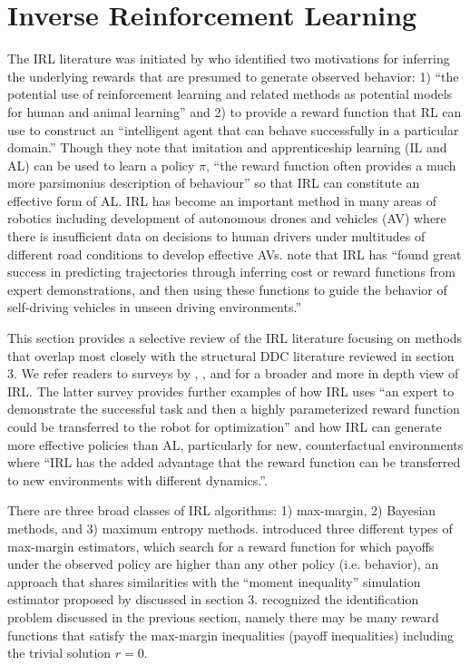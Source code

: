 
\section{Inverse Reinforcement Learning\label{sec:irl}}

The IRL literature was initiated by \citet{ng:2000} who identified two motivations for inferring the underlying
rewards that are presumed to generate observed behavior: 1) ``the potential use of reinforcement learning and
related methods as potential models for human and animal learning'' and 2) to provide a reward function
that RL can use to construct an ``intelligent agent that can behave successfully in a particular domain.'' Though
they note that imitation and apprenticeship learning (IL and AL) can be used to learn a policy $\pi$, ``the reward
function often provides a much more parsimonius description of behaviour'' so that IRL can constitute an effective
form of AL. IRL has become an important method in many areas of robotics including development of autonomous 
drones and vehicles (AV) where there is insufficient data on decisions to human drivers under multitudes of different
road conditions to develop effective AVs.  \citet{av:2025} note that IRL has ``found great success in predicting 
trajectories through inferring cost or reward functions from expert demonstrations, 
and then using these functions to guide the behavior of self-driving vehicles in unseen driving environments.''

This section provides a selective review of the IRL literature focusing on methods that overlap
most closely with the structural DDC literature reviewed in section 3. We refer readers to surveys 
by \citet{arora:2021}, \citet{gleave:2022}, and \citet{adams:2022} for a broader and more in depth view of IRL.
The latter survey
provides further examples of how IRL uses  ``an expert to demonstrate the successful task and then a highly parameterized reward function could be transferred to the robot for optimization'' and how IRL can generate more effective policies than AL, particularly
for new, counterfactual environments where
``IRL has the added advantage that the reward function can be transferred to new environments with different dynamics.''.

There are three broad classes of IRL algorithms: 1) max-margin, 2) Bayesian methods, and 3) maximum entropy methods.
\citet{ng:2000} introduced three different types of max-margin estimators, which
search for a reward function for which payoffs under the observed policy are 
higher than any other policy (i.e. behavior), an approach that shares similarities with the ``moment inequality'' simulation
estimator  proposed by \citet{bbl:2007} discussed in section 3. \citet{ng:2000} recognized the identification problem discussed
in the previous section, namely there may be many reward functions that satisfy the max-margin inequalities (payoff inequalities)
including the trivial solution $r=0$. 

